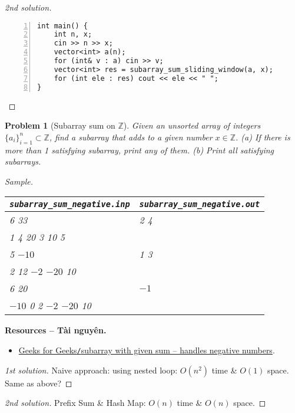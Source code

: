 \documentclass{article}
\newtheorem{problem}{Problem}
\begin{document}
\begin{proof}[2nd solution]
\begin{enumerate}
\begin{Verbatim}[numbers=left,xleftmargin=5mm]
int main() {
    int n, x;
    cin >> n >> x;
    vector<int> a(n);
    for (int& v : a) cin >> v;
    vector<int> res = subarray_sum_sliding_window(a, x);
    for (int ele : res) cout << ele << " ";
}
        \end{Verbatim}
    \end{enumerate}
\end{proof}

\begin{problem}[Subarray sum on $\mathbb{Z}$]
    Given an unsorted array of integers $\{a_i\}_{i=1}^n\subset\mathbb{Z}$, find a subarray that adds to a given number $x\in\mathbb{Z}$. (a) If there is more than 1 satisfying subarray, print any of them. (b) Print all satisfying subarrays.
    \item {\sf Sample.}
    \begin{table}[H]
        \centering
        \begin{tabular}{|l|l|}
            \hline
            \verb|subarray_sum_negative.inp| & \verb|subarray_sum_negative.out| \\
            \hline
            6 33 & 2 4 \\
            1 4 20 3 10 5 & \\
            \hline
            5 $-10$ & 1 3 \\
            2 12 $-2$ $-20$ 10 & \\
            \hline
            6 20 & $-1$ \\
            $-10$ 0 2 $-2$ $-20$ 10 & \\
            \hline
        \end{tabular}
    \end{table}
\end{problem}
\textbf{\textsf{Resources -- Tài nguyên.}}
\begin{itemize}
    \item \href{https://www.geeksforgeeks.org/dsa/find-subarray-with-given-sum-in-array-of-integers/}{Geeks for Geeks{\tt/}subarray with given sum -- handles negative numbers}.
\end{itemize}

\begin{proof}[1st solution]
    {\sf Naive approach: using nested loop: $O(n^2)$ time \& $O(1)$ space.} Same as above?
\end{proof}

\begin{proof}[2nd solution]
    {\sf Prefix Sum \& Hash Map: $O(n)$ time \& $O(n)$ space.}
\end{proof}
\end{document}
